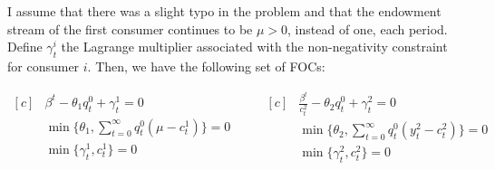 \documentclass[]{article}
\begin{document}
I assume that there was a slight typo in the problem and that the endowment stream of the first consumer continues to be \textbf{\boldmath$\mu > 0$}, instead of one, each period. Define $\gamma_t^i$ the Lagrange multiplier associated with the non-negativity constraint for consumer $i$. Then, we have the following set of FOCs:

\begin{equation}
	\begin{aligned}[c]
		&\beta^t - \theta_1q_t^0 + \gamma_t^1 = 0 \\
		&\min\{\theta_1, \sum\limits_{t = 0}^\infty q_t^0(\mu - c_t^1)\} = 0\\
		&\min\{\gamma_t^1, c_t^1\} = 0 \nonumber
	\end{aligned}\qquad
	\begin{aligned}[c]
		&\frac{\beta^t}{c_t^2} - \theta_2q_t^0 + \gamma_t^2 = 0 \\
		&\min\{\theta_2, \sum\limits_{t = 0}^\infty q_t^0(y_t^2 - c_t^2)\} = 0 \\
		&\min\{\gamma_t^2, c_t^2\} = 0
	\end{aligned}
\end{equation}
\end{document}
